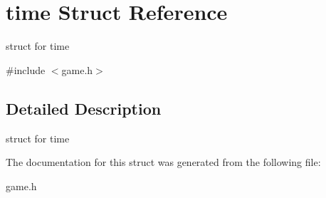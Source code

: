 \hypertarget{structtime}{}\section{time Struct Reference}
\label{structtime}


struct for time  




{\ttfamily \#include $<$game.\+h$>$}



\subsection{Detailed Description}
struct for time 

The documentation for this struct was generated from the following file\+:\begin{DoxyCompactItemize}
\item 
game.\+h\end{DoxyCompactItemize}
